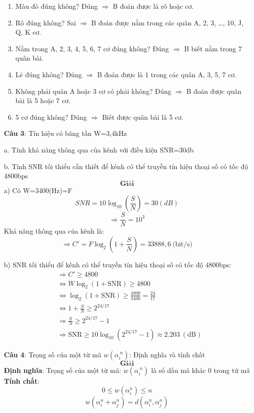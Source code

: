 \documentclass[12pt]{article}
\begin{document}
\begin{enumerate}
    \item Màu đỏ đúng không? Đúng $\Rightarrow$ B đoán được là rô hoặc cơ.
    \item Rô đúng không? Sai $\Rightarrow$ B đoán được nằm trong các quân A, 2, 3, \ldots, 10, J, Q, K cơ.
    \item Nằm trong A, 2, 3, 4, 5, 6, 7 cơ đúng không? Đúng $\Rightarrow$ B biết nằm trong 7 quân bài.
    \item Lẻ đúng không? Đúng $\Rightarrow$ B đoán được là 1 trong các quân A, 3, 5, 7 cơ.
    \item Không phải quân A hoặc 3 cơ có phải không? Đúng $\Rightarrow$ B đoán được quân bài là 5 hoặc 7 cơ.
    \item 5 cơ đúng không? Đúng $\Rightarrow$ Biết được quân bài là 5 cơ.
\end{enumerate}








\newpage
\textbf{Câu 3}: Tín hiệu có băng tần W=3,4kHz

a. Tính khả năng thông qua của kênh với điều kiện SNR=30db

b. Tính SNR tối thiểu cần thiết để kênh có thể truyền tín hiệu thoại số có tốc độ 4800bps
\[
\textbf{Giải}
\]
a) Có W=3400(Hz)=F
\[
SNR=10 \log_{10} \left( \frac{S}{N} \right)=30 (dB)
\]
\[
\Rightarrow \frac{S}{N} = 10^3
\]
Khả năng thông qua của kênh là:
\[
\Rightarrow C' = F \log_2\left(1 + \frac{S}{N}\right) = 33888{,}6\ \text{(bit/s)}
\]

b) SNR tối thiểu để kênh có thể truyền tín hiệu thoại số có tốc độ 4800bps:
\[
\begin{aligned}
&\Rightarrow C' \geq 4800 \\
&\Leftrightarrow W \log_2(1 + \text{SNR}) \geq 4800 \\
&\Leftrightarrow \log_2(1 + \text{SNR}) \geq \frac{4800}{3400} = \frac{24}{17} \\
&\Leftrightarrow 1 + \frac{S}{N} \geq 2^{24/17} \\
&\Rightarrow \frac{S}{N} \geq 2^{24/17} - 1 \\
&\Rightarrow \text{SNR} \geq 10 \log_{10}\left(2^{24/17} - 1\right) \approx 2.203 \ (\text{dB})
\end{aligned}
\]

\newpage
\textbf{Câu 4}: Trọng số của một từ mã $w(\alpha_i^{\ n})$: Định nghĩa và tính chất
\[
\textbf{Giải}
\]
\textbf{Định nghĩa}: Trọng số của một từ mã: $w(\alpha_i^{\ n})$ là số dấu mã khác 0 trong từ mã
\textbf{Tính chất}:
\[
0 \leq w(\alpha_i^n) \leq n
\]
\[
w(\alpha_i^n + \alpha_j^n) = d(\alpha_i^n, \alpha_j^n)
\]
\end{document}
